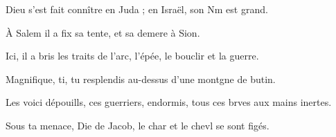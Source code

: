 \item Dieu s’est fait connître en Juda ;\psstar{} en Israël, son Nm est grand.
\item À Salem il a fix sa tente,\psstar{} et sa demere à Sion.
\item Ici, il a bris les traits de l’arc,\psstar{} l’épée, le bouclir et la guerre.
\item Magnifique, ti, tu resplendis\psstar{} au-dessus d’une montgne de butin.
\item Les voici dépouills, ces guerriers,\psstar{} endormis, tous ces brves aux mains inertes.
\item Sous ta menace, Die de Jacob,\psstar{} le char et le chevl se sont figés.